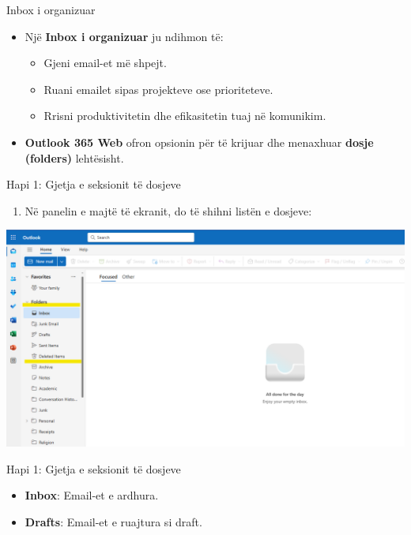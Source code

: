 \documentclass[
  ignorenonframetext,
]{beamer}
\providecommand{\tightlist}{%
  \setlength{\itemsep}{0pt}\setlength{\parskip}{0pt}}
\begin{document}
\begin{frame}{Inbox i organizuar}
\label{inbox-i-organizuar}
\begin{itemize}
\item
  Një \textbf{Inbox i organizuar} ju ndihmon të:

  \begin{itemize}
  \item
    Gjeni email-et më shpejt.
  \item
    Ruani emailet sipas projekteve ose prioriteteve.
  \item
    Rrisni produktivitetin dhe efikasitetin tuaj në komunikim.
  \end{itemize}
\item
  \textbf{Outlook 365 Web} ofron opsionin për të krijuar dhe menaxhuar
  \textbf{dosje (folders)} lehtësisht.
\end{itemize}
\end{frame}

\begin{frame}{Hapi 1: Gjetja e seksionit të dosjeve}
\label{hapi-1-gjetja-e-seksionit-tuxeb-dosjeve}
\begin{enumerate}
\tightlist
\item
  Në panelin e majtë të ekranit, do të shihni listën e dosjeve:
\end{enumerate}

\includegraphics{./images/outlook11.png}
\end{frame}

\begin{frame}{Hapi 1: Gjetja e seksionit të dosjeve}
\label{hapi-1-gjetja-e-seksionit-tuxeb-dosjeve-1}
\begin{itemize}
\item
  \textbf{Inbox}: Email-et e ardhura.
\item
  \textbf{Drafts}: Email-et e ruajtura si draft.
\end{itemize}
\end{frame}
\end{document}
